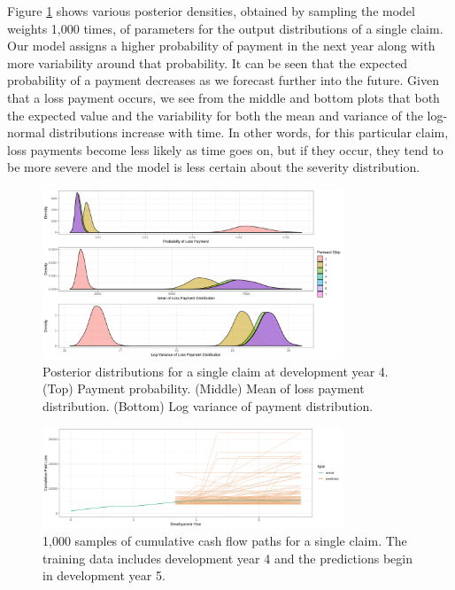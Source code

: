\documentclass{article}
\begin{document}
Figure \ref{fig:prob_cash_flows} shows various posterior densities, obtained by
sampling the model weights 1,000 times, of parameters for the output 
distributions of a single claim. Our model assigns a higher probability of 
payment in the next year along with more variability around that probability. 
It can be seen that the expected probability of a payment decreases as we 
forecast further into the future. Given that a loss payment occurs, we see from
the middle and bottom plots that both the expected value and the variability for
both the mean and variance of the log-normal distributions increase with time. 
In other words, for this particular claim, loss payments become less likely as 
time goes on, but if they occur, they tend to be more severe and the model is 
less certain about the severity distribution.

\begin{figure}
  \begin{center}
    \includegraphics[width=0.8\textwidth]{images/posteriors.png}
  \end{center}
  \caption{Posterior distributions for a single claim at development year 4. 
  (Top) Payment probability. (Middle) Mean of loss payment distribution. 
  (Bottom) Log variance of payment distribution.}
  \label{fig:prob_cash_flows}
\end{figure}

\begin{figure}
  \begin{center}
    \includegraphics[width=0.8\textwidth]{images/claim_paths.png}
  \end{center}
  \caption{1,000 samples of cumulative cash flow paths for a single claim. The 
  training data includes development year 4 and the predictions begin in development year 5.}
  \label{fig:claim_paths}
\end{figure}
\end{document}
